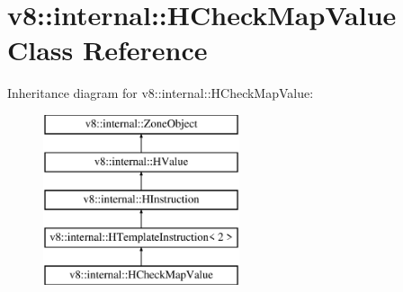 \hypertarget{classv8_1_1internal_1_1_h_check_map_value}{}\section{v8\+:\+:internal\+:\+:H\+Check\+Map\+Value Class Reference}
\label{classv8_1_1internal_1_1_h_check_map_value}
Inheritance diagram for v8\+:\+:internal\+:\+:H\+Check\+Map\+Value\+:\begin{figure}[H]
\begin{center}
\leavevmode
\includegraphics[height=5.000000cm]{classv8_1_1internal_1_1_h_check_map_value}
\end{center}
\end{figure}
